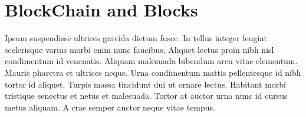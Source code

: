 \section{BlockChain and Blocks}
\label{sec:blockchain}

Ipsum suspendisse ultrices gravida dictum fusce. In tellus integer feugiat scelerisque varius morbi enim nunc faucibus. Aliquet lectus proin nibh nisl condimentum id venenatis. Aliquam malesuada bibendum arcu vitae elementum. Mauris pharetra et ultrices neque. Urna condimentum mattis pellentesque id nibh tortor id aliquet. Turpis massa tincidunt dui ut ornare lectus. Habitant morbi tristique senectus et netus et malesuada. Tortor at auctor urna nunc id cursus metus aliquam. A cras semper auctor neque vitae tempus.
